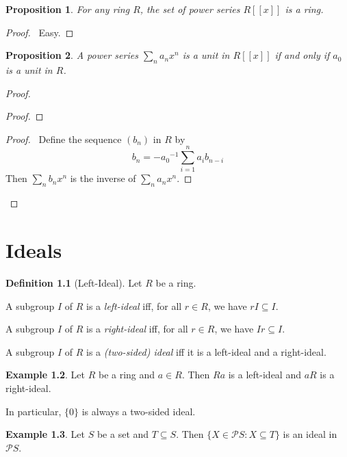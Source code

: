 \documentclass{book}
\let\qed\relax
\newtheorem{prop}{Proposition}[chapter]
\theoremstyle{definition}
\newtheorem{df}[prop]{Definition}
\newtheorem{ex}[prop]{Example}
\newcommand{\inv}[1]{\ensuremath{{#1}^{-1}}}
\begin{document}
\begin{prop}
For any ring $R$, the set of power series $R[[x]]$ is a ring.
\end{prop}

\begin{proof}
\pf\ Easy. \qed
\end{proof}

\begin{prop}
A power series $\sum_n a_n x^n$ is a unit in $R[[x]]$ if and only if $a_0$ is a unit in $R$.
\end{prop}

\begin{proof}
\pf
{}
\begin{proof}
\end{proof}
\begin{proof}
	\pf\ Define the sequence $(b_n)$ in $R$ by
	\[ b_n = - \inv{a_0} \sum_{i=1}^n a_i b_{n-i} \]
	Then $\sum_n b_n x^n$ is the inverse of $\sum_n a_n x^n$.
\end{proof}
\qed
\end{proof}

\chapter{Ideals}

\begin{df}[Left-Ideal]
Let $R$ be a ring.

A subgroup $I$ of $R$ is a \emph{left-ideal} iff, for all $r \in R$, we have $rI \subseteq I$.

A subgroup $I$ of $R$ is a \emph{right-ideal} iff, for all $r \in R$, we have $Ir \subseteq I$.

A subgroup $I$ of $R$ is a \emph{(two-sided) ideal} iff it is a left-ideal and a right-ideal.
\end{df}

\begin{ex}
Let $R$ be a ring and $a \in R$. Then $Ra$ is a left-ideal and $aR$ is a right-ideal.

In particular, $\{0\}$ is always a two-sided ideal.
\end{ex}

\begin{ex}
Let $S$ be a set and $T \subseteq S$. Then $\{ X \in \mathcal{P} S : X \subseteq T \}$ is an ideal in $\mathcal{P} S$.
\end{ex}
\end{document}
